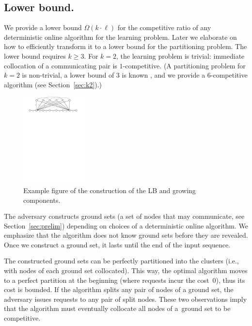 \documentclass[manuscript,screen=true, review, anonymous]{acmart}
\begin{document}
\subsection{Lower bound.}

\label{sec:lowerbound}


We provide a lower bound $\Omega(k\cdot \ell)$ for the competitive ratio of any deterministic online algorithm for the learning problem.
Later we elaborate on how to efficiently transform it to a lower bound for the partitioning problem.
The lower bound requires $k\geq 3$.
For $k=2$, the learning problem is trivial: immediate collocation of a communicating pair is $1$-competitive.
(A partitioning problem for $k=2$ is non-trivial, a lower bound of $3$ is known \cite{repartition-disc}, and we provide a $6$-competitive algorithm (see Section~\ref{sec:k2}).)




\begin{figure}[H]
	\centering
	\includegraphics[width=0.3\textwidth]{figs/substitute}
	\caption{Example figure of the construction of the LB and growing components.}
	\label{fig:nptree-construction}
\end{figure}


The adversary constructs ground sets (a set of nodes that may communicate, see Section~\ref{sec:prelim}) depending on choices of a deterministic online algorithm.
We emphasize that the algorithm does not know ground sets before they are revealed.
Once we construct a ground set, it lasts until the end of the input sequence.

The constructed ground sets can be perfectly partitioned into the clusters (i.e., with nodes of each ground set collocated).
This way, the optimal algorithm moves to a perfect partition at the beginning (where requests incur the cost~$0$), thus its cost is bounded.
If the algorithm splits any pair of nodes of a ground set, the adversary issues requests to any pair of split nodes.
These two observations imply that the algorithm must eventually collocate all nodes of a~ground set to be competitive.
\end{document}
